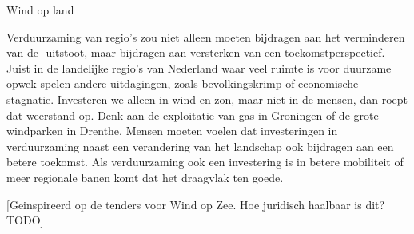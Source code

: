 \begin{voorstel}{Wind op land}
\begin{multicols}{2}
\begin{aanbevelingen}
Verduurzaming van regio’s zou niet alleen moeten bijdragen aan het verminderen van de \COO-uitstoot, maar bijdragen aan versterken van een toekomstperspectief. Juist in de landelijke regio’s van Nederland waar veel ruimte is voor duurzame opwek spelen andere uitdagingen, zoals bevolkingskrimp of economische stagnatie. Investeren we alleen in wind en zon, maar niet in de mensen, dan roept dat weerstand op. Denk aan de exploitatie van gas in Groningen of de grote windparken in Drenthe. Mensen moeten voelen dat investeringen in verduurzaming naast een verandering van het landschap ook bijdragen aan een betere toekomst. Als verduurzaming ook een investering is in betere mobiliteit of meer regionale banen komt dat het draagvlak ten goede.

[Geinspireerd op de tenders voor Wind op Zee. Hoe juridisch haalbaar is dit? TODO]
\end{aanbevelingen}

\end{multicols}


\end{voorstel}
